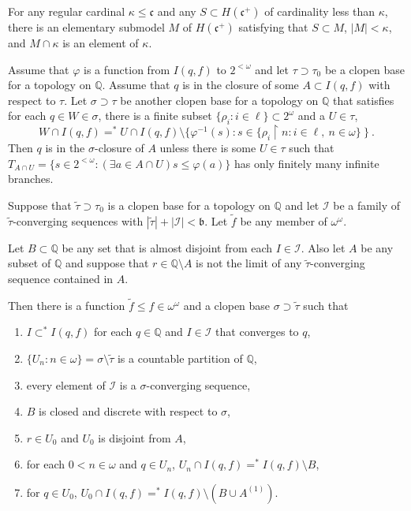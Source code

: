 \documentclass[10pt,a4paper]{amsart}
\begin{document}
\begin{proposition} For any regular cardinal $\kappa\leq \mathfrak c$
and\label{getModels}
any $S\subset H(\mathfrak c^+)$ of cardinality less than $\kappa$,
there is an elementary submodel $M$ of $H(\mathfrak c^+)$ satisfying
that $S\subset M$, $|M|<\kappa$, and $M\cap \kappa$ is an element of $\kappa$.
\end{proposition}

   \begin{proposition} 
   Assume    that $\varphi$ is a\label{ringRule}  
   function from $I(q,f)$ to $2^{<\omega}$
and let $ \tau\supset\tau_0$ be a clopen base 
for a topology on $\mathbb Q$. Assume that $q$ is in 
the closure of some $A\subset I(q,f)$ with respect to
$\tau$. Let $\sigma\supset  \tau$ be another
clopen base for a topology on $\mathbb Q$ that satisfies
    for each $q\in W\in \sigma$, there is a finite
   subset $\{ \rho_i : i\in\ell\}\subset 2^\omega$ 
   and a $U\in  \tau $,
   $$W\cap I(q,f) =^* U\cap I(q,f) \setminus
     \{ \varphi^{-1}(s) : s\in \{ \rho_i \restriction n: i\in\ell, \ n\in\omega\}~\}~.$$
Then  $q$ is in the $\sigma$-closure of $A$ unless there is some $U\in\tau$
such that 
$T_{A\cap U} = \{  s\in 2^{<\omega} :
 (\exists a \in A\cap U) s \leq \varphi(a)  \}$ has only finitely many
infinite branches.
   \end{proposition}

\begin{lemma} Suppose that $\tilde \tau \supset \tau_0$ is a
clopen base\label{mainLemma} for a topology on $\mathbb Q$ and let $\mathcal I$
be a family of $\tilde \tau $-converging sequences with $
|\tilde \tau | + |\mathcal I|<\mathfrak b$. Let $\tilde f$ be any
member of $\omega^\omega$.

Let $B\subset \mathbb Q$ be any set that is almost disjoint from each $I\in \mathcal I$.
Also let $A$ be any subset of $\mathbb Q$ and suppose that $r\in \mathbb Q\setminus A$
is not the limit of any  $\tilde \tau $-converging sequence contained in $A$.
 \medskip

 Then there is a function $\tilde f\leq f\in \omega^\omega$ and a
 clopen base $\sigma\supset \tilde \tau$ such that
 \begin{enumerate}
 \item   $I\subset^* I(q,f)$ for each $q\in \mathbb Q$ and $I\in\mathcal I$ that converges
 to $q$,
 \item $\{U_n: n\in\omega\} = \sigma\setminus \tilde \tau$ is a countable partition of $\mathbb Q$,
 \item every element of $\mathcal I$ is a $\sigma$-converging sequence,
 \item $B$ is closed and discrete with respect to $\sigma$,
 \item $r\in U_0$  and $U_0$ is disjoint from  $A$,
 \item for each $0<n\in\omega$ and $ q\in   U_n$,  
    $U_n\cap I(q,f) =^* I(q,f)\setminus B$,
  \item for $q\in U_0 $, 
   $U_0\cap I(q,f) =^* I(q,f) \setminus (B\cup A^{(1)})$.
 \end{enumerate}
 \end{lemma}
\end{document}
